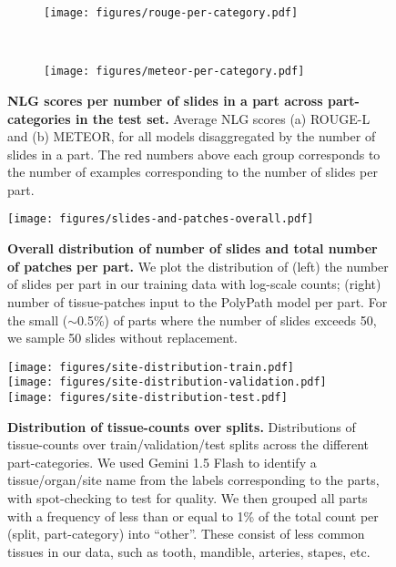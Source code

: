 \documentclass[11pt]{article}
\begin{document}
\begin{figure}[h]
\centering
  \begin{subfigure}[b]{\textwidth}
    \centering
    \texttt{[image: figures/rouge-per-category.pdf]}
    \caption{}
    \label{fig:rougepercategory}
  \end{subfigure}
  \\
  \begin{subfigure}[b]{\textwidth}
  \centering
  \texttt{[image: figures/meteor-per-category.pdf]}
  \caption{}
  \label{fig:meteorpercategory}
  \end{subfigure}
\caption{\small \textbf{NLG scores per number of slides in a part across part-categories in the test set.} Average NLG scores (a) ROUGE-L and (b) METEOR, for all models disaggregated by the number of slides in a part. The red numbers above each group corresponds to the number of examples corresponding to the number of slides per part.}
\label{fig:nlgpercategory}
\end{figure}


\begin{figure}[h]
\centering
\texttt{[image: figures/slides-and-patches-overall.pdf]} \\
\caption{\small \textbf{Overall distribution of number of slides and total number of patches per part.} We plot the distribution of (left) the number of slides per part in our training data with log-scale counts; (right) number of tissue-patches input to the PolyPath model per part. For the small ($\sim$0.5\%) of parts where the number of slides exceeds 50, we sample 50 slides without replacement.}
\label{fig:slidesandpatchesoverall}
\end{figure}


\begin{figure}[h]
\centering
\texttt{[image: figures/site-distribution-train.pdf]} \\
\texttt{[image: figures/site-distribution-validation.pdf]} \\
\texttt{[image: figures/site-distribution-test.pdf]}
\caption{\small \textbf{Distribution of tissue-counts over splits.} Distributions of tissue-counts over train/validation/test splits across the different part-categories. We used Gemini 1.5 Flash to identify a tissue/organ/site name from the labels corresponding to the parts, with spot-checking to test for quality. We then grouped all parts with a frequency of less than or equal to 1\% of the total count per (split, part-category) into “other”. These consist of less common tissues in our data, such as tooth, mandible, arteries, stapes, etc.}
\label{fig:sitedistribution}
\end{figure}
\end{document}
